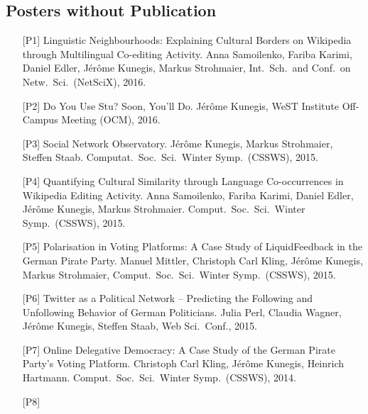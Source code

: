 \documentclass[line,mm]{res}
\newcounter{x}
\newcounter{y}
\begin{document}
\begin{resume}
\section{Posters without Publication}
\begin{itemize}
  \item[{[P1]}] 
    Linguistic Neighbourhoods:  Explaining Cultural Borders on
    Wikipedia through Multilingual Co-editing Activity.  Anna
    Samoilenko, Fariba Karimi, Daniel Edler, Jérôme Kunegis, Markus
    Strohmaier, Int.\ Sch.\ and Conf.\ on Netw.\ Sci.\ (NetSciX),
    2016. 
  \item[{[P2]}]
    Do You Use Stu? Soon, You'll Do.
    Jérôme Kunegis, 
    WeST Institute Off-Campus Meeting (OCM), 2016. 
  \item[{[P3]}]
    Social Network Observatory.  Jérôme Kunegis, Markus Strohmaier,
    Steffen Staab.  Computat.\ Soc.\ Sci.\ Winter Symp.\ (CSSWS), 2015.
  \item[{[P4]}] 
    Quantifying Cultural Similarity through Language Co-occurrences
    in Wikipedia Editing Activity. Anna Samoilenko, Fariba Karimi,
    Daniel Edler, Jérôme Kunegis, Markus Strohmaier.  Comput.\ Soc.\ Sci.\ Winter Symp.\ (CSSWS), 2015.
  \item[{[P5]}] 
    Polarisation in Voting Platforms: A Case Study of LiquidFeedback
    in the German Pirate Party. Manuel Mittler, Christoph Carl Kling,
    Jérôme Kunegis, Markus Strohmaier, Comput.\ Soc.\ Sci.\ Winter Symp.\ (CSSWS), 2015.
  \item[{[P6]}]
    Twitter as a Political Network -- Predicting the Following and
    Unfollowing Behavior of {German} Politicians. Julia Perl, Claudia
    Wagner, Jérôme Kunegis, Steffen Staab, Web Sci.\ Conf., 2015. 
  \item[{[P7]}] 
    Online Delegative Democracy: A Case Study of the German Pirate
    Party's Voting Platform.  Christoph Carl Kling, Jérôme Kunegis,
    Heinrich Hartmann.  Comput.\ Soc.\ Sci.\ Winter
    Symp.\ (CSSWS), 2014.
  \item[{[P8]}]

\end{itemize}
\end{resume}
\end{document}
